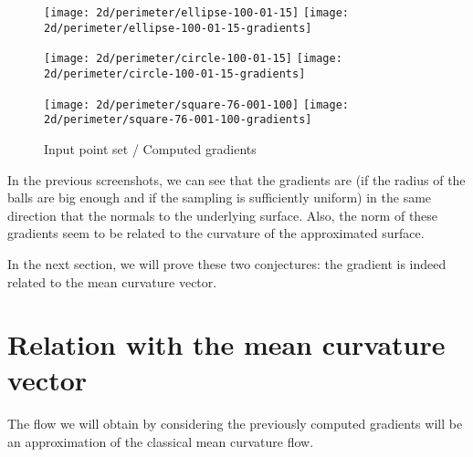 \begin{figure}[H]
    \centering

    \begin{minipage}{0.8\linewidth}
        \centering
        \texttt{[image: 2d/perimeter/ellipse-100-01-15]}
        \texttt{[image: 2d/perimeter/ellipse-100-01-15-gradients]}
        \label{fig:gradients_perimeter_2d_ellipse}
    \end{minipage}

    \begin{minipage}{0.8\linewidth}
        \centering
        \texttt{[image: 2d/perimeter/circle-100-01-15]}
        \texttt{[image: 2d/perimeter/circle-100-01-15-gradients]}
        \label{fig:gradients_perimeter_2d_circle}
    \end{minipage}

    \begin{minipage}{0.8\linewidth}
        \centering
        \texttt{[image: 2d/perimeter/square-76-001-100]}
        \texttt{[image: 2d/perimeter/square-76-001-100-gradients]}
        \label{fig:gradients_perimeter_2d_square}
    \end{minipage}

    \caption{Input point set / Computed gradients}
    \label{fig:gradients_perimeter_2d}
\end{figure}

In the previous screenshots, we can see that the gradients are (if the radius of
the balls are big enough and if the sampling is sufficiently uniform) in the
same direction that the normals to the underlying surface. Also, the norm of
these gradients seem to be related to the curvature of the approximated surface.

In the next section, we will prove these two conjectures: the gradient is indeed
related to the mean curvature vector.


\section{Relation with the mean curvature vector}

The flow we will obtain by considering the previously computed gradients will be
an approximation of the classical mean curvature flow.

